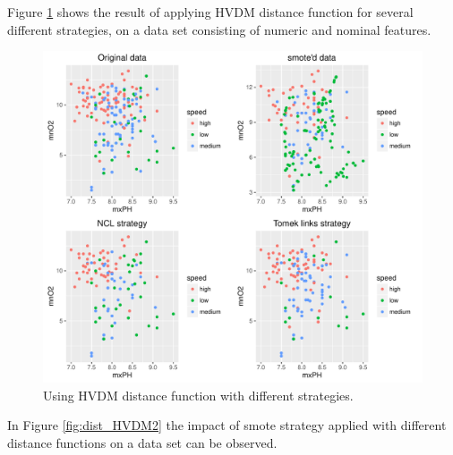 \documentclass[10pt,a4paper]{article}\usepackage[]{graphicx}\usepackage[]{color}
\makeatletter
\def\maxwidth{ %
  \ifdim\Gin@nat@width>\linewidth
    \linewidth
  \else
    \Gin@nat@width
  \fi
}
\newenvironment{knitrout}{}{} %
\makeatother
\begin{document}
Figure \ref{fig:dist_HVDM} shows the result of applying HVDM distance function for several different strategies, on a data set consisting of numeric and nominal features.
\begin{knitrout}\footnotesize
{}\color{fgcolor}\begin{figure}

{\centering \includegraphics[width=\maxwidth]{figures/UBL-dist_HVDM-1} 

}

\caption[Using HVDM distance function with different strategies]{Using HVDM distance function with different strategies.}\label{fig:dist_HVDM}
\end{figure}


\end{knitrout}


In Figure \ref{fig:dist_HVDM2} the impact of smote strategy applied with different distance functions on a data set can be observed.
\end{document}
